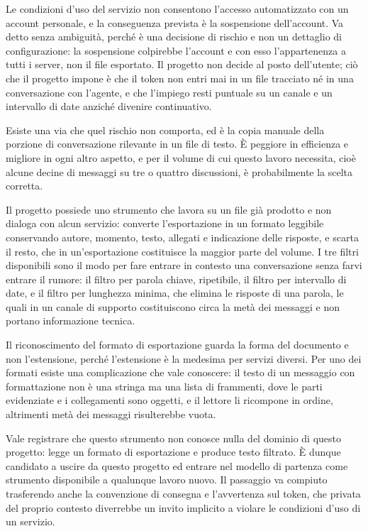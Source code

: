 Le condizioni d'uso del servizio non consentono l'accesso automatizzato con un account personale, e la conseguenza prevista è la sospensione dell'account. Va detto senza ambiguità, perché è una decisione di rischio e non un dettaglio di configurazione: la sospensione colpirebbe l'account e con esso l'appartenenza a tutti i server, non il file esportato. Il progetto non decide al posto dell'utente; ciò che il progetto impone è che il token non entri mai in un file tracciato né in una conversazione con l'agente, e che l'impiego resti puntuale su un canale e un intervallo di date anziché divenire continuativo.

Esiste una via che quel rischio non comporta, ed è la copia manuale della porzione di conversazione rilevante in un file di testo. È peggiore in efficienza e migliore in ogni altro aspetto, e per il volume di cui questo lavoro necessita, cioè alcune decine di messaggi su tre o quattro discussioni, è probabilmente la scelta corretta.

Il progetto possiede uno strumento che lavora su un file già prodotto e non dialoga con alcun servizio: converte l'esportazione in un formato leggibile conservando autore, momento, testo, allegati e indicazione delle risposte, e scarta il resto, che in un'esportazione costituisce la maggior parte del volume. I tre filtri disponibili sono il modo per fare entrare in contesto una conversazione senza farvi entrare il rumore: il filtro per parola chiave, ripetibile, il filtro per intervallo di date, e il filtro per lunghezza minima, che elimina le risposte di una parola, le quali in un canale di supporto costituiscono circa la metà dei messaggi e non portano informazione tecnica.

Il riconoscimento del formato di esportazione guarda la forma del documento e non l'estensione, perché l'estensione è la medesima per servizi diversi. Per uno dei formati esiste una complicazione che vale conoscere: il testo di un messaggio con formattazione non è una stringa ma una lista di frammenti, dove le parti evidenziate e i collegamenti sono oggetti, e il lettore li ricompone in ordine, altrimenti metà dei messaggi risulterebbe vuota.

Vale registrare che questo strumento non conosce nulla del dominio di questo progetto: legge un formato di esportazione e produce testo filtrato. È dunque candidato a uscire da questo progetto ed entrare nel modello di partenza come strumento disponibile a qualunque lavoro nuovo. Il passaggio va compiuto trasferendo anche la convenzione di consegna e l'avvertenza sul token, che privata del proprio contesto diverrebbe un invito implicito a violare le condizioni d'uso di un servizio.

